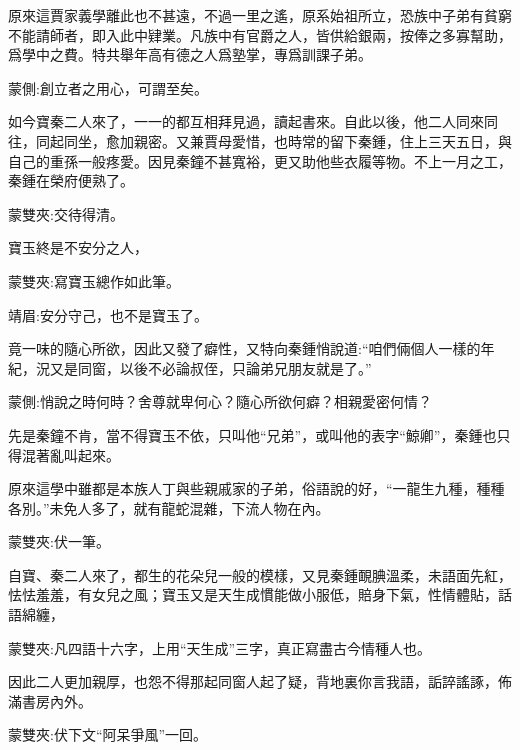 \begin{parag}
    原來這賈家義學離此也不甚遠，不過一里之遙，原系始祖所立，恐族中子弟有貧窮不能請師者，即入此中肄業。凡族中有官爵之人，皆供給銀兩，按俸之多寡幫助，爲學中之費。特共舉年高有德之人爲塾掌，專爲訓課子弟。\begin{note}蒙側:創立者之用心，可謂至矣。\end{note}如今寶秦二人來了，一一的都互相拜見過，讀起書來。自此以後，他二人同來同往，同起同坐，愈加親密。又兼賈母愛惜，也時常的留下秦鍾，住上三天五日，與自己的重孫一般疼愛。因見秦鐘不甚寬裕，更又助他些衣履等物。不上一月之工，秦鍾在榮府便熟了。\begin{note}蒙雙夾:交待得清。\end{note}寶玉終是不安分之人，\begin{note}蒙雙夾:寫寶玉總作如此筆。\end{note}\begin{note}靖眉:安分守己，也不是寶玉了。\end{note}竟一味的隨心所欲，因此又發了癖性，又特向秦鍾悄說道:“咱們倆個人一樣的年紀，況又是同窗，以後不必論叔侄，只論弟兄朋友就是了。”\begin{note}蒙側:悄說之時何時？舍尊就卑何心？隨心所欲何癖？相親愛密何情？\end{note}先是秦鐘不肯，當不得寶玉不依，只叫他“兄弟”，或叫他的表字“鯨卿”，秦鍾也只得混著亂叫起來。
\end{parag}


\begin{parag}
    原來這學中雖都是本族人丁與些親戚家的子弟，俗語說的好，“一龍生九種，種種各別。”未免人多了，就有龍蛇混雜，下流人物在內。\begin{note}蒙雙夾:伏一筆。\end{note}自寶、秦二人來了，都生的花朵兒一般的模樣，又見秦鍾靦腆溫柔，未語面先紅，怯怯羞羞，有女兒之風；寶玉又是天生成慣能做小服低，賠身下氣，性情體貼，話語綿纏，\begin{note}蒙雙夾:凡四語十六字，上用“天生成”三字，真正寫盡古今情種人也。\end{note}因此二人更加親厚，也怨不得那起同窗人起了疑，背地裏你言我語，詬誶謠諑，佈滿書房內外。\begin{note}蒙雙夾:伏下文“阿呆爭風”一回。\end{note}
\end{parag}


